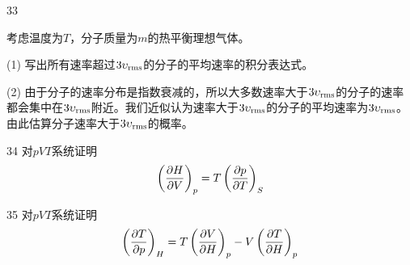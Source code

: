 \documentclass[CJK]{beamer}
\begin{document}
\begin{frame}
  \bch
  {\small
  \bitem
\item[33]{ 考虑温度为$T$，分子质量为$m$的热平衡理想气体。
    \bitem
	\item[(1)] {写出所有速率超过$3\upsilon_{\rm rms}$的分子的平均速率的积分表达式。}
	\item[(2)] {由于分子的速率分布是指数衰减的，所以大多数速率大于$3\upsilon_{\rm rms}$的分子的速率都会集中在$3\upsilon_{\rm rms}$附近。我们近似认为速率大于$3\upsilon_{\rm rms}$的分子的平均速率为$3\upsilon_{\rm rms}$。由此估算分子速率大于$3\upsilon_{\rm rms}$的概率。}
          \eitem
}
\item[34]{对$pVT$系统证明  $$\left(\frac{\partial H}{\partial V}\right)_{p} = T\left(\frac{\partial p}{\partial T}\right)_{S} $$}
\item[35]{对$pVT$系统证明$$\left(\frac{\partial T}{\partial p}\right)_{H} = T \left(\frac{\partial V}{\partial H}\right)_{p} - V\left(\frac{\partial T}{\partial H}\right)_{p}$$}
  \eitem
}
  
  \ech
\end{frame}
\end{document}
